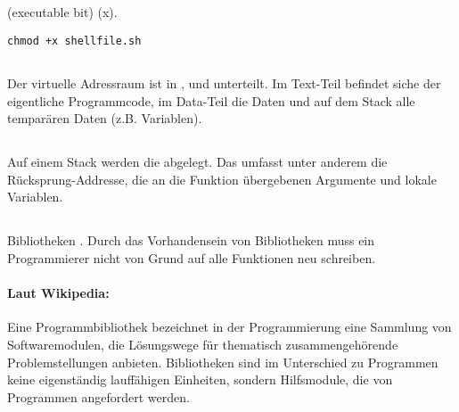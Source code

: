 \subsection{}
\begin{answer}
 (executable bit) (x). \\

\begin{lstlisting}
chmod +x shellfile.sh
\end{lstlisting}

\end{answer}

\subsection{}
\begin{answer}
Der virtuelle Adressraum ist in ,  und  unterteilt. Im Text-Teil befindet siche
der eigentliche Programmcode, im Data-Teil die Daten und auf dem Stack alle temparären
Daten (z.B. Variablen).
\end{answer}

\subsection{}
\begin{answer}
Auf einem Stack werden die  abgelegt. Das umfasst unter anderem die Rücksprung-Addresse, die an die Funktion übergebenen Argumente und lokale Variablen.
\end{answer}

\subsection{}
\begin{answer}
Bibliotheken . Durch das Vorhandensein von Bibliotheken muss ein Programmierer nicht von Grund auf alle Funktionen neu schreiben.

\paragraph{Laut Wikipedia:}
Eine Programmbibliothek bezeichnet in der Programmierung eine Sammlung von Softwaremodulen, die Lösungswege für thematisch zusammengehörende Problemstellungen anbieten. Bibliotheken sind im Unterschied zu Programmen keine eigenständig lauffähigen Einheiten, sondern Hilfsmodule, die von Programmen angefordert werden.
\end{answer}


